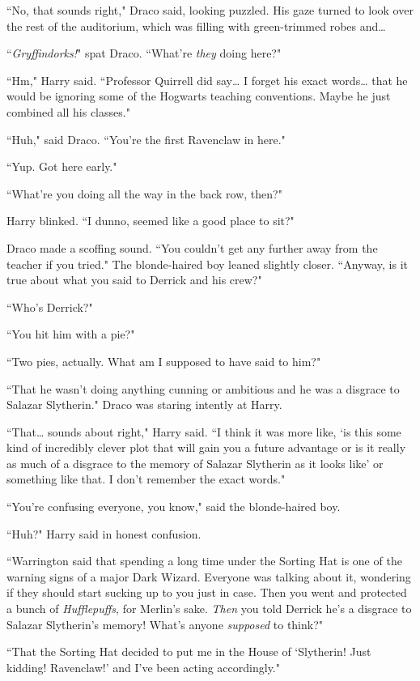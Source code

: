 ``No, that sounds right," Draco said, looking puzzled. His gaze turned to look over the rest of the auditorium, which was filling with green-trimmed robes and{\ldots}

``\emph{Gryffindorks!}" spat Draco. ``What're \emph{they} doing here?"

``Hm," Harry said. ``Professor Quirrell did say{\ldots} I forget his exact words{\ldots} that he would be ignoring some of the Hogwarts teaching conventions. Maybe he just combined all his classes."

``Huh," said Draco. ``You're the first Ravenclaw in here."

``Yup. Got here early."

``What're you doing all the way in the back row, then?"

Harry blinked. ``I dunno, seemed like a good place to sit?"

Draco made a scoffing sound. ``You couldn't get any further away from the teacher if you tried." The blonde-haired boy leaned slightly closer. ``Anyway, is it true about what you said to Derrick and his crew?"

``Who's Derrick?"

``You hit him with a pie?"

``Two pies, actually. What am I supposed to have said to him?"

``That he wasn't doing anything cunning or ambitious and he was a disgrace to Salazar Slytherin." Draco was staring intently at Harry.

``That{\ldots} sounds about right," Harry said. ``I think it was more like, `is this some kind of incredibly clever plot that will gain you a future advantage or is it really as much of a disgrace to the memory of Salazar Slytherin as it looks like' or something like that. I don't remember the exact words."

``You're confusing everyone, you know," said the blonde-haired boy.

``Huh?" Harry said in honest confusion.

``Warrington said that spending a long time under the Sorting Hat is one of the warning signs of a major Dark Wizard. Everyone was talking about it, wondering if they should start sucking up to you just in case. Then you went and protected a bunch of \emph{Hufflepuffs}, for Merlin's sake. \emph{Then} you told Derrick he's a disgrace to Salazar Slytherin's memory! What's anyone \emph{supposed} to think?"

``That the Sorting Hat decided to put me in the House of `Slytherin! Just kidding! Ravenclaw!' and I've been acting accordingly."

